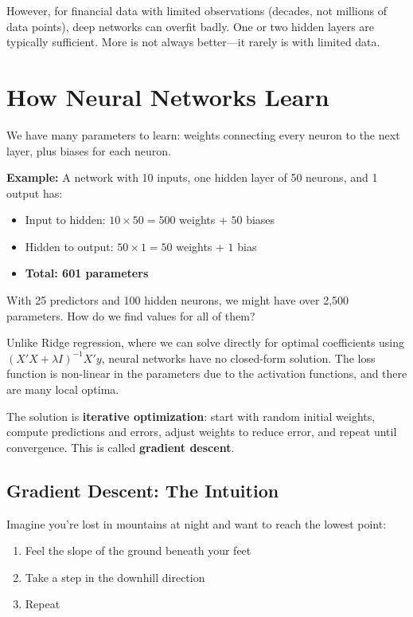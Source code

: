 \documentclass[11pt,a4paper]{article}
\newcommand{\keyword}[1]{\textbf{\textcolor{AccentOrange}{#1}}}
\begin{document}
However, for financial data with limited observations (decades, not millions of data points), deep networks can overfit badly. One or two hidden layers are typically sufficient. More is not always better---it rarely is with limited data.

\section{How Neural Networks Learn}

We have many parameters to learn: weights connecting every neuron to the next layer, plus biases for each neuron.

\textbf{Example:} A network with 10 inputs, one hidden layer of 50 neurons, and 1 output has:
\begin{itemize}
    \item Input to hidden: $10 \times 50 = 500$ weights + $50$ biases
    \item Hidden to output: $50 \times 1 = 50$ weights + $1$ bias
    \item \textbf{Total: 601 parameters}
\end{itemize}

With 25 predictors and 100 hidden neurons, we might have over 2,500 parameters. How do we find values for all of them?

Unlike Ridge regression, where we can solve directly for optimal coefficients using $(X'X + \lambda I)^{-1}X'y$, neural networks have no closed-form solution. The loss function is non-linear in the parameters due to the activation functions, and there are many local optima.

The solution is \keyword{iterative optimization}: start with random initial weights, compute predictions and errors, adjust weights to reduce error, and repeat until convergence. This is called \keyword{gradient descent}.

\subsection{Gradient Descent: The Intuition}

Imagine you're lost in mountains at night and want to reach the lowest point:
\begin{enumerate}
    \item Feel the slope of the ground beneath your feet
    \item Take a step in the downhill direction
    \item Repeat
\end{enumerate}
\end{document}
